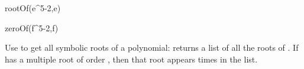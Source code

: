 {{{{{{{{{{{\begin{xtc}
\begin{xtccomment}
\end{xtccomment}
\begin{spadsrc}
rootOf(e^5-2,e)
\end{spadsrc}
\begin{TeXOutput}
\begin{fricasmath}{8}
%
\end{fricasmath}
\end{TeXOutput}
\end{xtc}
\begin{xtc}
\begin{xtccomment}
\end{xtccomment}
\begin{spadsrc}
zeroOf(f^5-2,f)
\end{spadsrc}
\begin{TeXOutput}
\begin{fricasmath}{9}
%
\end{fricasmath}
\end{TeXOutput}
\end{xtc}


Use  to get all symbolic roots of a polynomial:
 returns a
list of all the roots of .
If  has a multiple root of order , then that root
appears  times in the list.

}}}}}}}}}}}
